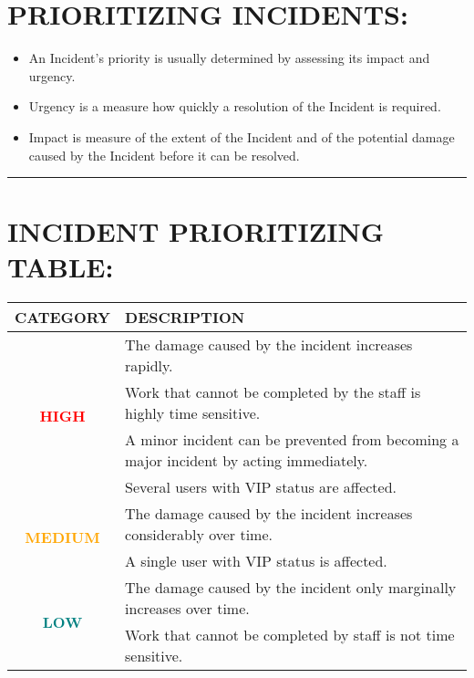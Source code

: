 \documentclass[10pt,british,english]{article}
\providecommand{\tabularnewline}{\\}
\begin{document}
\section{PRIORITIZING INCIDENTS:}
\begin{itemize}
\item An Incident's priority is usually determined by assessing its impact
and urgency.
\item Urgency is a measure how quickly a resolution of the Incident is required.
\item Impact is measure of the extent of the Incident and of the potential
damage caused by the Incident before it can be resolved.
\end{itemize}
\rule[0.5ex]{1\columnwidth}{1pt}

\pagebreak{}

\section{INCIDENT PRIORITIZING TABLE:}

\begin{tabular}{|c|l|}
\hline 
\textbf{CATEGORY} & \textbf{DESCRIPTION}\tabularnewline
\hline 
\hline 
\multirow{4}{*}{\textbf{\textcolor{red}{\Large{}HIGH}}} & The damage caused by the incident increases rapidly. \tabularnewline
\cline{2-2} 
 & Work that cannot be completed by the staff is highly time sensitive.\tabularnewline
\cline{2-2} 
 & A minor incident can be prevented from becoming a major incident by
acting immediately.\tabularnewline
\cline{2-2} 
 & Several users with VIP status are affected.\tabularnewline
\hline 
\multirow{2}{*}{\textbf{\textcolor{orange}{\Large{}MEDIUM}}} & The damage caused by the incident increases considerably over time. \tabularnewline
\cline{2-2} 
 & A single user with VIP status is affected. \tabularnewline
\hline 
\multirow{2}{*}{\textbf{\textcolor{teal}{\Large{}LOW}}} & The damage caused by the incident only marginally increases over time. \tabularnewline
\cline{2-2} 
 & Work that cannot be completed by staff is not time sensitive.\tabularnewline
\hline 
\end{tabular}
\end{document}
